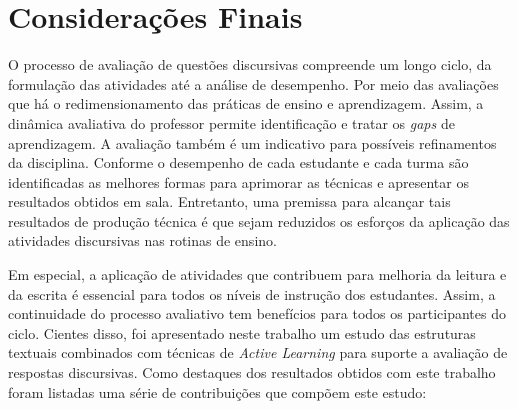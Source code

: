 \chapter{Considerações Finais}
\label{cap-conclusao}

O processo de avaliação de questões discursivas compreende um longo ciclo, da formulação das atividades até a análise de desempenho. Por meio das avaliações que há o redimensionamento das práticas de ensino e aprendizagem. Assim, a dinâmica avaliativa do professor permite identificação e tratar os \textit{gaps} de aprendizagem. A avaliação também é um indicativo para possíveis refinamentos da disciplina. Conforme o desempenho de cada estudante e cada turma são identificadas as melhores formas para aprimorar as técnicas e apresentar os resultados obtidos em sala. Entretanto, uma premissa para alcançar tais resultados de produção técnica é que sejam reduzidos os esforços da aplicação das atividades discursivas nas rotinas de ensino.

Em especial, a aplicação de atividades que contribuem para melhoria da leitura e da escrita é essencial para todos os níveis de instrução dos estudantes. Assim, a continuidade do processo avaliativo tem benefícios para todos os participantes do ciclo. Cientes disso, foi apresentado neste trabalho um estudo das estruturas textuais combinados com técnicas de \textit{Active Learning} para suporte a avaliação de respostas discursivas. Como destaques dos resultados obtidos com este trabalho foram listadas uma série de contribuições que compõem este estudo:

